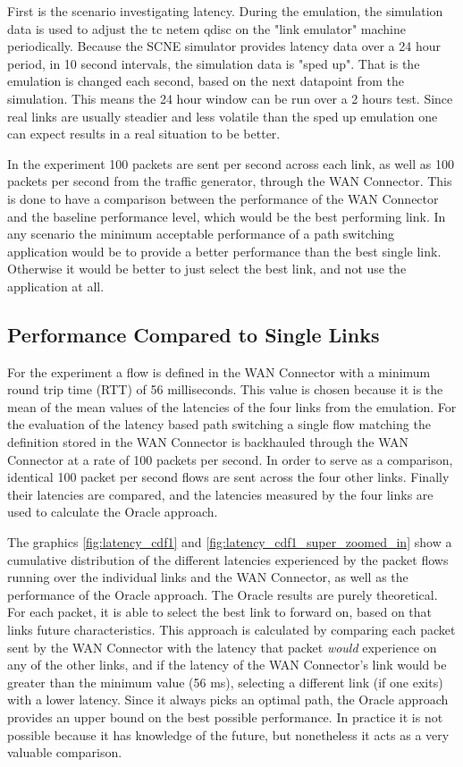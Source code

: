 First is the scenario investigating latency. During the emulation, the simulation data is used to adjust the tc netem qdisc on the "link emulator" machine periodically. Because the SCNE simulator provides latency data over a 24 hour period, in 10 second intervals, the simulation data is "sped up". That is the emulation is changed each second, based on the next datapoint from the simulation. This means the 24 hour window can be run over a 2 hours test. Since real links are usually steadier and less volatile than the sped up emulation one can expect results in a real situation to be better.

In the experiment 100 packets are sent per second across each link, as well as 100 packets per second from the traffic generator, through the WAN Connector. This is done to have a comparison between the performance of the WAN Connector and the baseline performance level, which would be the best performing link. In any scenario the minimum acceptable performance of a path switching application would be to provide a better performance than the best single link. Otherwise it would be better to just select the best link, and not use the application at all.


\subsection{Performance Compared to Single Links}

For the experiment a flow is defined in the WAN Connector with a minimum round trip time (RTT) of 56 milliseconds. This value is chosen because it is the mean of the mean values of the latencies of the four links from the emulation. For the evaluation of the latency based path switching a single flow matching the definition stored in the WAN Connector is backhauled through the WAN Connector at a rate of 100 packets per second. In order to serve as a comparison, identical 100 packet per second flows are sent across the four other links. Finally their latencies are compared, and the latencies measured by the four links are used to calculate the Oracle approach.

The graphics \ref{fig:latency_cdf1} and \ref{fig:latency_cdf1_super_zoomed_in} show a cumulative distribution of the different latencies experienced by the packet flows running over the individual links and the WAN Connector, as well as the performance of the Oracle approach. The Oracle results are purely theoretical. For each packet, it is able to select the best link to forward on, based on that links future characteristics. This approach is calculated by comparing each packet sent by the WAN Connector with the latency that packet \textit{would} experience on any of the other links, and if the latency of the WAN Connector's link would be greater than the minimum value (56 ms), selecting a different link (if one exits) with a lower latency. Since it always picks an optimal path, the Oracle approach provides an upper bound on the best possible performance. In practice it is not possible because it has knowledge of the future, but nonetheless it acts as a very valuable comparison.

